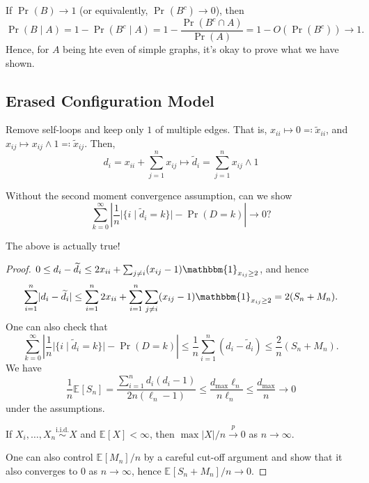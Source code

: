 \begin{note}
	If \(\Pr_{}\left(B\right) \to 1\) (or equivalently, \(\Pr_{}\left(B^{c} \right) \to 0\)), then
	\[
		\Pr_{}\left(B \mid A\right)
		= 1 - \Pr_{}\left(B^{c} \mid A\right)
		= 1 - \frac{\Pr_{}\left(B^{c} \cap A\right) }{\Pr_{}\left(A\right) }
		= 1 - O(\Pr_{}\left(B^{c} \right) )
		\to 1.
	\]
	Hence, for \(A\) being hte even of simple graphs, it's okay to prove what we have shown.
\end{note}

\subsection{Erased Configuration Model}
Remove self-loops and keep only \(1\) of multiple edges. That is, \(x_{ii} \mapsto 0 \eqqcolon \widetilde{x} _{ii}\), and \(x_{ij} \mapsto x_{ij} \land 1 \eqqcolon \widetilde{x} _{ij}\). Then,
\[
	d_i
	= x_{ii} + \sum_{j=1}^{n} x_{ij}
	\mapsto \widetilde{d} _i
	= \sum_{j=1}^{n} x_{ij} \land 1
\]

\begin{problem*}
	Without the second moment convergence assumption, can we show
	\[
		\sum_{k=0}^{\infty} \left\lvert \frac{1}{n}\lvert \{ i \mid \widetilde{d} _i = k \} \rvert - \Pr_{}\left(D = k\right) \right\rvert
		\to 0?
	\]
\end{problem*}

\begin{lemma}
	The above is actually true!
\end{lemma}
\begin{proof}
	\(0 \leq d_i - \widetilde{d} _i \leq 2 x_{ii} + \sum_{j \neq i} (x_{ij} - 1) \mathbbm{1}_{x_{ij} \geq 2} \), and hence
	\[
		\sum_{i=1}^{n} \lvert d_i - \widetilde{d} _i \rvert
		\leq \sum_{i=1}^{n} 2 x_{ii} + \sum_{i=1}^{n} \sum_{j \neq i} (x_{ij} - 1) \mathbbm{1}_{x_{ij} \geq 2}
		= 2(S_n + M_n).
	\]
	One can also check that
	\[
		\sum_{k=0}^{\infty} \left\lvert \frac{1}{n}\lvert \{ i \mid \widetilde{d} _i = k \} \rvert - \Pr_{}\left(D = k\right) \right\rvert
		\leq \frac{1}{n} \sum_{i=1}^{n} (d_i - \widetilde{d} _i)
		\leq \frac{2}{n} (S_n + M_n).
	\]
	We have
	\[
		\frac{1}{n} \mathbb{E}_{}[S_n]
		= \frac{\sum_{i=1}^{n} d_i (d_i - 1)}{2n(\ell _n - 1)}
		\leq \frac{d_{\max } \ell _n}{n \ell _n}
		\leq \frac{d_{\max }}{n}
		\to 0
	\]
	under the assumptions.

	\begin{exercise}
		If \(X_i, \dots , X_n \overset{\text{i.i.d.} }{\sim } X\) and \(\mathbb{E}_{}[X] < \infty \), then \(\max \lvert X \rvert / n \overset{p}{\to} 0\) as \(n \to \infty \).
	\end{exercise}

	One can also control \(\mathbb{E}_{}[M_n] / n\) by a careful cut-off argument and show that it also converges to \(0\) as \(n \to \infty \), hence \(\mathbb{E}_{}[S_n + M_n] / n \to 0\).
\end{proof}